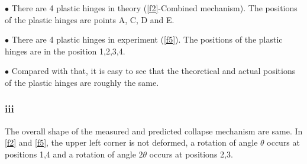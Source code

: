 $\bullet$ There are 4 plastic hinges in theory (\autoref{f2}-Combined mechanism). The positions of the plastic hinges are points A, C, D and E.

$\bullet$ There are 4 plastic hinges in experiment (\autoref{f5}). The positions of the plastic hinges are in the position 1,2,3,4.

$\bullet$ Compared with that, it is easy to see that the theoretical and actual positions of the plastic hinges are roughly the same.

\subsubsection*{iii}

The overall shape of the measured and predicted collapse mechanism are same. In \autoref{f2} and \autoref{f5}, the upper left corner is not deformed, a rotation of angle $\theta$ occurs at positions 1,4 and a rotation of angle $2\theta$ occurs at positions 2,3.
\fi